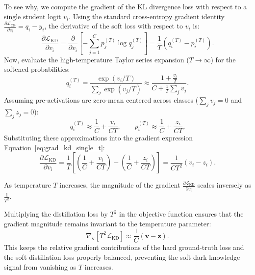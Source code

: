 To see why, we compute the gradient of the KL divergence loss with respect to a single student logit $v_i$. Using the standard cross-entropy gradient identity $\frac{\partial \mathcal{L}_{\text{CE}}}{\partial z_i} = q_i - y_i$, the derivative of the soft loss with respect to $v_i$ is:
\begin{equation}
\frac{\partial \mathcal{L}_{\text{KD}}}{\partial v_i} = \frac{\partial}{\partial v_i} \left[ -\sum_{j=1}^C p_j^{(T)} \log q_j^{(T)} \right] = \frac{1}{T} \left( q_i^{(T)} - p_i^{(T)} \right).
\label{eq:grad_kd_single_t}
\end{equation}
Now, evaluate the high-temperature Taylor series expansion ($T \to \infty$) for the softened probabilities:
\begin{equation}
q_i^{(T)} = \frac{\exp(v_i / T)}{\sum_j \exp(v_j / T)} \approx \frac{1 + \frac{v_i}{T}}{C + \frac{1}{T}\sum_j v_j}.
\end{equation}
Assuming pre-activations are zero-mean centered across classes ($\sum_j v_j = 0$ and $\sum_j z_j = 0$):
\begin{equation}
q_i^{(T)} \approx \frac{1}{C} + \frac{v_i}{C T}, \qquad p_i^{(T)} \approx \frac{1}{C} + \frac{z_i}{C T}.
\end{equation}
Substituting these approximations into the gradient expression Equation~\eqref{eq:grad_kd_single_t}:
\begin{equation}
\frac{\partial \mathcal{L}_{\text{KD}}}{\partial v_i} = \frac{1}{T} \left[ \left( \frac{1}{C} + \frac{v_i}{C T} \right) - \left( \frac{1}{C} + \frac{z_i}{C T} \right) \right] = \frac{1}{C T^2} (v_i - z_i).
\label{eq:t_squared_vanishing_grad}
\end{equation}

\begin{theorem}
As temperature $T$ increases, the magnitude of the gradient $\frac{\partial \mathcal{L}_{\text{KD}}}{\partial v_i}$ scales inversely as $\frac{1}{T^2}$. 

Multiplying the distillation loss by $T^2$ in the objective function ensures that the gradient magnitude remains invariant to the temperature parameter:
\begin{equation}
\nabla_{\mathbf{v}} \left[ T^2 \mathcal{L}_{\text{KD}} \right] \approx \frac{1}{C} (\mathbf{v} - \mathbf{z}).
\end{equation}
This keeps the relative gradient contributions of the hard ground-truth loss and the soft distillation loss properly balanced, preventing the soft dark knowledge signal from vanishing as $T$ increases.
\end{theorem}

